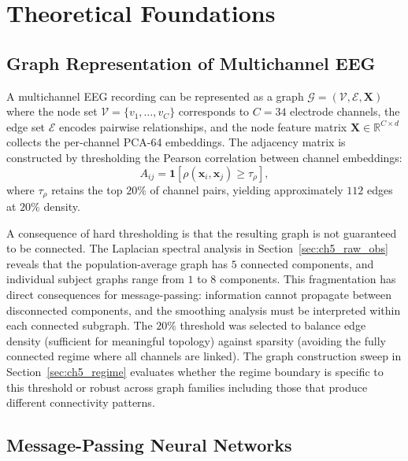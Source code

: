 \section{Theoretical Foundations}
\label{sec:ch5_gnn_theory}

\subsection{Graph Representation of Multichannel EEG}

A multichannel EEG recording can be represented as a graph $\mathcal{G} = (\mathcal{V}, \mathcal{E}, \mathbf{X})$ where the node set $\mathcal{V} = \{v_1, \ldots, v_C\}$ corresponds to $C = 34$ electrode channels, the edge set $\mathcal{E}$ encodes pairwise relationships, and the node feature matrix $\mathbf{X} \in \mathbb{R}^{C \times d}$ collects the per-channel PCA-64 embeddings. The adjacency matrix is constructed by thresholding the Pearson correlation between channel embeddings:
\begin{equation}
    A_{ij} = \mathbf{1}\left[\rho(\mathbf{x}_i, \mathbf{x}_j) \geq \tau_\rho\right],
\end{equation}
where $\tau_\rho$ retains the top $20\%$ of channel pairs, yielding approximately $112$ edges at $20\%$ density.

A consequence of hard thresholding is that the resulting graph is not guaranteed to be connected. The Laplacian spectral analysis in Section~\ref{sec:ch5_raw_obs} reveals that the population-average graph has $5$ connected components, and individual subject graphs range from $1$ to $8$ components. This fragmentation has direct consequences for message-passing: information cannot propagate between disconnected components, and the smoothing analysis must be interpreted within each connected subgraph. The $20\%$ threshold was selected to balance edge density (sufficient for meaningful topology) against sparsity (avoiding the fully connected regime where all channels are linked). The graph construction sweep in Section~\ref{sec:ch5_regime} evaluates whether the regime boundary is specific to this threshold or robust across graph families including those that produce different connectivity patterns.

\subsection{Message-Passing Neural Networks}

